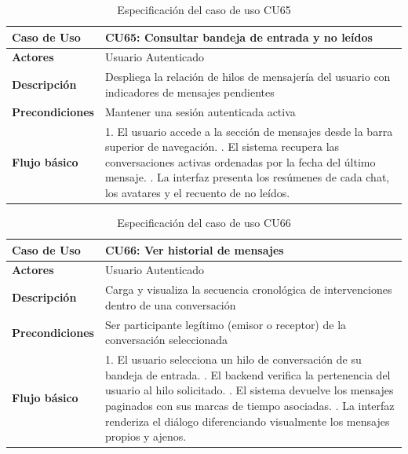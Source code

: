 \begin{table}[H]
\centering
\begin{tabular}{|p{3.2cm}|p{11.3cm}|}
\hline
\textbf{Caso de Uso} & \textbf{CU65: Consultar bandeja de entrada y no leídos} \\ \hline
\textbf{Actores} & Usuario Autenticado \\ \hline
\textbf{Descripción} & Despliega la relación de hilos de mensajería del usuario con indicadores de mensajes pendientes \\ \hline
\textbf{Precondiciones} & Mantener una sesión autenticada activa \\ \hline
\textbf{Flujo básico} & 
1. El usuario accede a la sección de mensajes desde la barra superior de navegación. \newline
2. El sistema recupera las conversaciones activas ordenadas por la fecha del último mensaje. \newline
3. La interfaz presenta los resúmenes de cada chat, los avatares y el recuento de no leídos. \\ \hline
\end{tabular}
\caption{Especificación del caso de uso CU65}
\label{tab:cu65}
\end{table}

\begin{table}[H]
\centering
\begin{tabular}{|p{3.2cm}|p{11.3cm}|}
\hline
\textbf{Caso de Uso} & \textbf{CU66: Ver historial de mensajes} \\ \hline
\textbf{Actores} & Usuario Autenticado \\ \hline
\textbf{Descripción} & Carga y visualiza la secuencia cronológica de intervenciones dentro de una conversación \\ \hline
\textbf{Precondiciones} & Ser participante legítimo (emisor o receptor) de la conversación seleccionada \\ \hline
\textbf{Flujo básico} & 
1. El usuario selecciona un hilo de conversación de su bandeja de entrada. \newline
2. El backend verifica la pertenencia del usuario al hilo solicitado. \newline
3. El sistema devuelve los mensajes paginados con sus marcas de tiempo asociadas. \newline
4. La interfaz renderiza el diálogo diferenciando visualmente los mensajes propios y ajenos. \\ \hline
\end{tabular}
\caption{Especificación del caso de uso CU66}
\label{tab:cu66}
\end{table}

